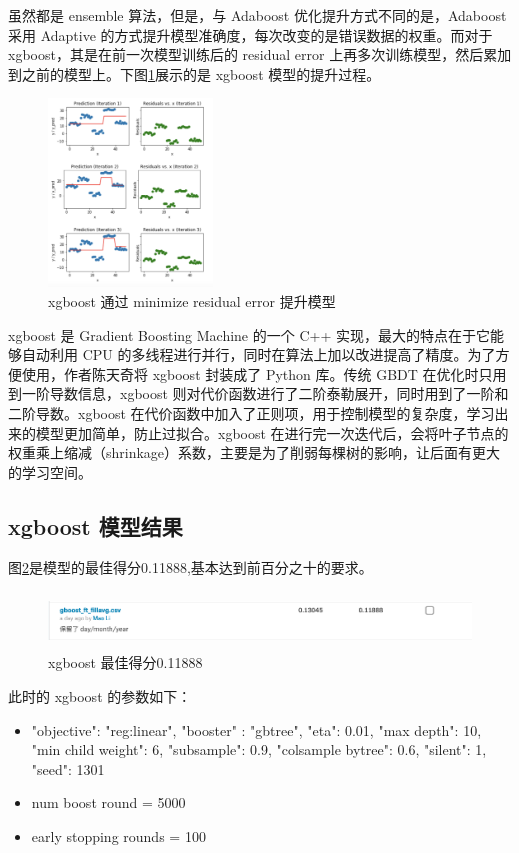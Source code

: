 \documentclass[a4paper]{article}
\begin{document}
虽然都是 ensemble 算法，但是，与 Adaboost 优化提升方式不同的是，Adaboost 采用 Adaptive 的方式提升模型准确度，每次改变的是错误数据的权重。而对于 xgboost，其是在前一次模型训练后的 residual error 上再多次训练模型，然后累加到之前的模型上。下图\ref{fig:residual}展示的是 xgboost 模型的提升过程。

\begin{figure}[ht]
 \centering
 \includegraphics[height=5cm,width=\textwidth]{images/residual}
 \caption{xgboost 通过 minimize residual error 提升模型}
 \label{fig:residual}
\end{figure}



xgboost 是 Gradient Boosting Machine 的一个 C++ 实现，最大的特点在于它能够自动利用 CPU 的多线程进行并行，同时在算法上加以改进提高了精度。为了方便使用，作者陈天奇将 xgboost 封装成了 Python 库。传统 GBDT 在优化时只用到一阶导数信息，xgboost 则对代价函数进行了二阶泰勒展开，同时用到了一阶和二阶导数。xgboost 在代价函数中加入了正则项，用于控制模型的复杂度，学习出来的模型更加简单，防止过拟合。xgboost 在进行完一次迭代后，会将叶子节点的权重乘上缩减（shrinkage）系数，主要是为了削弱每棵树的影响，让后面有更大的学习空间。

\subsection{xgboost 模型结果}
图\ref{fig:best-score}是模型的最佳得分0.11888,基本达到前百分之十的要求。
\begin{figure}[ht]
 \centering
 \includegraphics[height=1.5cm,width=\textwidth]{images/best-score}
 \caption{xgboost 最佳得分0.11888}
 \label{fig:best-score}
\end{figure}
此时的 xgboost 的参数如下：
\begin{itemize}
    \item "objective": "reg:linear",
          "booster" : "gbtree",
          "eta": 0.01,
          "max depth": 10,
          "min child weight": 6,
          "subsample": 0.9,
          "colsample bytree": 0.6,
          "silent": 1,
          "seed": 1301
    \item num boost round = 5000
    \item early stopping rounds = 100
\end{itemize}
\end{document}
